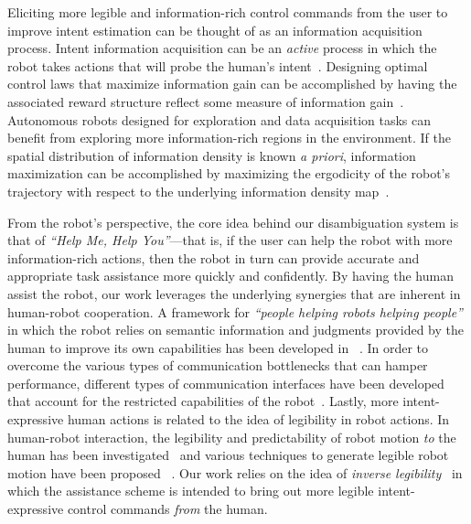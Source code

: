 \documentclass[natbib, twocolumn]{svjour3}          %
\begin{document}
Eliciting more legible and information-rich control commands from the user to improve intent estimation can be thought of as an information acquisition process. Intent information acquisition can be an \textit{active} process in which the robot takes actions that will probe the human's intent~\citep{sadigh2016information}. Designing optimal control laws that maximize information gain can be accomplished by having the associated reward structure reflect some measure of information gain~\citep{atanasov2014information}. 
Autonomous robots designed for exploration and data acquisition tasks can benefit from exploring more information-rich regions in the environment. If the spatial distribution of information density is known \textit{a priori}, information maximization can be accomplished by maximizing the ergodicity of the robot's trajectory with respect to the underlying information density map~\citep{miller2016ergodic, miller2013trajectory}. 


From the robot's perspective, the core idea behind our disambiguation system is that of \textit{``Help Me, Help You''}---that is, if the user can help the robot with more information-rich actions, then the robot in turn can provide accurate and appropriate task assistance more quickly and confidently. By having the human assist the robot, our work leverages the underlying synergies that are inherent in human-robot cooperation. A framework for \textit{``people helping robots helping people''} in which the robot relies on semantic information and judgments provided by the human to improve its own capabilities has been developed in ~\citep{sorokin2010people}. In order to overcome the various types of communication bottlenecks that can hamper performance, different types of communication interfaces have been developed that account for the restricted capabilities of the robot~\citep{goodfellow2010help}. Lastly, more intent-expressive human actions is related to the idea of legibility in robot actions. In human-robot interaction, the legibility and predictability of robot motion \textit{to} the human has been investigated~\citep{dragan2013legibility} and various techniques to generate legible robot motion have been proposed ~\citep{holladay2014legible}. Our work relies on the idea of \textit{inverse legibility}~\citep{gopinath2017mode} in which the assistance scheme is intended to bring out more legible intent-expressive control commands \textit{from} the human. 
\end{document}
